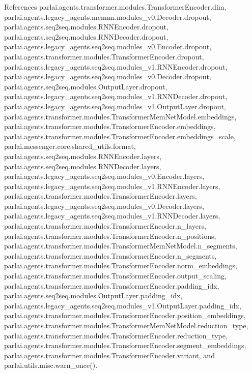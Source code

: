 References parlai.\+agents.\+transformer.\+modules.\+Transformer\+Encoder.\+dim, parlai.\+agents.\+legacy\+\_\+agents.\+memnn.\+modules\+\_\+v0.\+Decoder.\+dropout, parlai.\+agents.\+seq2seq.\+modules.\+R\+N\+N\+Encoder.\+dropout, parlai.\+agents.\+seq2seq.\+modules.\+R\+N\+N\+Decoder.\+dropout, parlai.\+agents.\+legacy\+\_\+agents.\+seq2seq.\+modules\+\_\+v0.\+Encoder.\+dropout, parlai.\+agents.\+transformer.\+modules.\+Transformer\+Encoder.\+dropout, parlai.\+agents.\+legacy\+\_\+agents.\+seq2seq.\+modules\+\_\+v1.\+R\+N\+N\+Encoder.\+dropout, parlai.\+agents.\+legacy\+\_\+agents.\+seq2seq.\+modules\+\_\+v0.\+Decoder.\+dropout, parlai.\+agents.\+seq2seq.\+modules.\+Output\+Layer.\+dropout, parlai.\+agents.\+legacy\+\_\+agents.\+seq2seq.\+modules\+\_\+v1.\+R\+N\+N\+Decoder.\+dropout, parlai.\+agents.\+legacy\+\_\+agents.\+seq2seq.\+modules\+\_\+v1.\+Output\+Layer.\+dropout, parlai.\+agents.\+transformer.\+modules.\+Transformer\+Mem\+Net\+Model.\+embeddings, parlai.\+agents.\+transformer.\+modules.\+Transformer\+Encoder.\+embeddings, parlai.\+agents.\+transformer.\+modules.\+Transformer\+Encoder.\+embeddings\+\_\+scale, parlai.\+messenger.\+core.\+shared\+\_\+utils.\+format, parlai.\+agents.\+seq2seq.\+modules.\+R\+N\+N\+Encoder.\+layers, parlai.\+agents.\+seq2seq.\+modules.\+R\+N\+N\+Decoder.\+layers, parlai.\+agents.\+legacy\+\_\+agents.\+seq2seq.\+modules\+\_\+v0.\+Encoder.\+layers, parlai.\+agents.\+legacy\+\_\+agents.\+seq2seq.\+modules\+\_\+v1.\+R\+N\+N\+Encoder.\+layers, parlai.\+agents.\+transformer.\+modules.\+Transformer\+Encoder.\+layers, parlai.\+agents.\+legacy\+\_\+agents.\+seq2seq.\+modules\+\_\+v0.\+Decoder.\+layers, parlai.\+agents.\+legacy\+\_\+agents.\+seq2seq.\+modules\+\_\+v1.\+R\+N\+N\+Decoder.\+layers, parlai.\+agents.\+transformer.\+modules.\+Transformer\+Encoder.\+n\+\_\+layers, parlai.\+agents.\+transformer.\+modules.\+Transformer\+Encoder.\+n\+\_\+positions, parlai.\+agents.\+transformer.\+modules.\+Transformer\+Mem\+Net\+Model.\+n\+\_\+segments, parlai.\+agents.\+transformer.\+modules.\+Transformer\+Encoder.\+n\+\_\+segments, parlai.\+agents.\+transformer.\+modules.\+Transformer\+Encoder.\+norm\+\_\+embeddings, parlai.\+agents.\+transformer.\+modules.\+Transformer\+Encoder.\+output\+\_\+scaling, parlai.\+agents.\+transformer.\+modules.\+Transformer\+Encoder.\+padding\+\_\+idx, parlai.\+agents.\+seq2seq.\+modules.\+Output\+Layer.\+padding\+\_\+idx, parlai.\+agents.\+legacy\+\_\+agents.\+seq2seq.\+modules\+\_\+v1.\+Output\+Layer.\+padding\+\_\+idx, parlai.\+agents.\+transformer.\+modules.\+Transformer\+Encoder.\+position\+\_\+embeddings, parlai.\+agents.\+transformer.\+modules.\+Transformer\+Mem\+Net\+Model.\+reduction\+\_\+type, parlai.\+agents.\+transformer.\+modules.\+Transformer\+Encoder.\+reduction\+\_\+type, parlai.\+agents.\+transformer.\+modules.\+Transformer\+Encoder.\+segment\+\_\+embeddings, parlai.\+agents.\+transformer.\+modules.\+Transformer\+Encoder.\+variant, and parlai.\+utils.\+misc.\+warn\+\_\+once().



